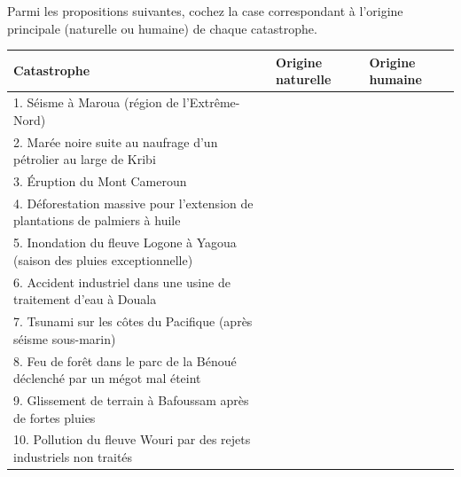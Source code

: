 \documentclass[11pt]{article}
\begin{document}
\begin{exercice}
Parmi les propositions suivantes, cochez la case correspondant à l'origine principale (naturelle ou humaine) de chaque catastrophe.

\begin{center}
\begin{tabularx}{\linewidth}{|l|X|X|}\hline
\rowcolor{popblueL}\textbf{Catastrophe} & \textbf{Origine naturelle} & \textbf{Origine humaine} \\ \hline
1. Séisme à Maroua (région de l'Extrême-Nord) & \fbox{\phantom{XX}} & \fbox{\phantom{XX}} \\ \hline
2. Marée noire suite au naufrage d'un pétrolier au large de Kribi & \fbox{\phantom{XX}} & \fbox{\phantom{XX}} \\ \hline
3. Éruption du Mont Cameroun & \fbox{\phantom{XX}} & \fbox{\phantom{XX}} \\ \hline
4. Déforestation massive pour l'extension de plantations de palmiers à huile & \fbox{\phantom{XX}} & \fbox{\phantom{XX}} \\ \hline
5. Inondation du fleuve Logone à Yagoua (saison des pluies exceptionnelle) & \fbox{\phantom{XX}} & \fbox{\phantom{XX}} \\ \hline
6. Accident industriel dans une usine de traitement d'eau à Douala & \fbox{\phantom{XX}} & \fbox{\phantom{XX}} \\ \hline
7. Tsunami sur les côtes du Pacifique (après séisme sous-marin) & \fbox{\phantom{XX}} & \fbox{\phantom{XX}} \\ \hline
8. Feu de forêt dans le parc de la Bénoué déclenché par un mégot mal éteint & \fbox{\phantom{XX}} & \fbox{\phantom{XX}} \\ \hline
9. Glissement de terrain à Bafoussam après de fortes pluies & \fbox{\phantom{XX}} & \fbox{\phantom{XX}} \\ \hline
10. Pollution du fleuve Wouri par des rejets industriels non traités & \fbox{\phantom{XX}} & \fbox{\phantom{XX}} \\ \hline
\end{tabularx}
\end{center}
\end{exercice}
\end{document}
